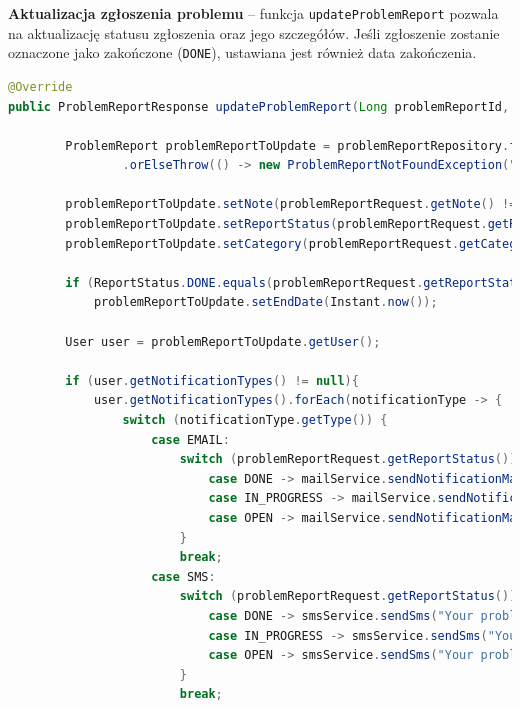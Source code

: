 \textbf{Aktualizacja zgłoszenia problemu} -- funkcja \texttt{updateProblemReport} pozwala na aktualizację statusu zgłoszenia oraz jego szczegółów. Jeśli zgłoszenie zostanie oznaczone jako zakończone (\texttt{DONE}), ustawiana jest również data zakończenia.

\begin{lstlisting}[language=Java, caption=Aktualizacja zgłoszenia problemu.]
@Override
public ProblemReportResponse updateProblemReport(Long problemReportId, ProblemReportRequest problemReportRequest) throws ProblemReportNotFoundException {

        ProblemReport problemReportToUpdate = problemReportRepository.findById(problemReportId)
                .orElseThrow(() -> new ProblemReportNotFoundException("Problem report not found with id: " + problemReportId));

        problemReportToUpdate.setNote(problemReportRequest.getNote() != null ? problemReportRequest.getNote() : problemReportToUpdate.getNote());
        problemReportToUpdate.setReportStatus(problemReportRequest.getReportStatus() != null ? problemReportRequest.getReportStatus() : problemReportToUpdate.getReportStatus());
        problemReportToUpdate.setCategory(problemReportRequest.getCategory() != null ? problemReportRequest.getCategory() : problemReportToUpdate.getCategory());

        if (ReportStatus.DONE.equals(problemReportRequest.getReportStatus()))
            problemReportToUpdate.setEndDate(Instant.now());

        User user = problemReportToUpdate.getUser();

        if (user.getNotificationTypes() != null){
            user.getNotificationTypes().forEach(notificationType -> {
                switch (notificationType.getType()) {
                    case EMAIL:
                        switch (problemReportRequest.getReportStatus()) {
                            case DONE -> mailService.sendNotificationMail("Problem report done", "Your problem report has been done", user.getEmail());
                            case IN_PROGRESS -> mailService.sendNotificationMail("Problem report in progress", "Your problem report is in progress", user.getEmail());
                            case OPEN -> mailService.sendNotificationMail("Problem report open", "Your problem report is open", user.getEmail());
                        }
                        break;
                    case SMS:
                        switch (problemReportRequest.getReportStatus()) {
                            case DONE -> smsService.sendSms("Your problem report has been done", user.getPhoneNumber());
                            case IN_PROGRESS -> smsService.sendSms("Your problem report is in progress", user.getPhoneNumber());
                            case OPEN -> smsService.sendSms("Your problem report is open", user.getPhoneNumber());
                        }
                        break;


\end{lstlisting}
